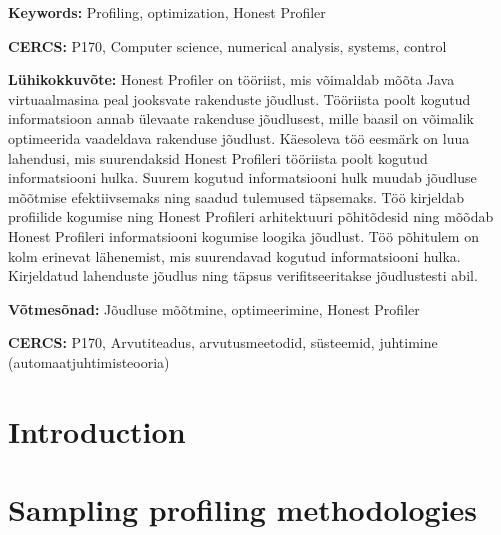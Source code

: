 \documentclass{style/thesis}
\begin{document}
\vspace*{3ex}
  \textbf{Keywords:} 
  Profiling, optimization, Honest Profiler
\vspace*{3ex}

\noindent\textbf{CERCS:} 
  P170, Computer science, numerical analysis, systems, control 

\vspace*{5ex}
\noindent\textbf{\large \articleNameEE}
\vspace*{0mm}

\noindent\textbf{Lühikokkuvõte:} Honest Profiler on tööriist, mis võimaldab mõõta Java virtuaalmasina peal jooksvate rakenduste jõudlust. Tööriista poolt kogutud informatsioon annab ülevaate rakenduse jõudlusest, mille baasil on võimalik optimeerida vaadeldava rakenduse jõudlust. Käesoleva töö eesmärk on luua lahendusi, mis suurendaksid Honest Profileri tööriista poolt kogutud informatsiooni hulka. Suurem kogutud informatsiooni hulk muudab jõudluse mõõtmise efektiivsemaks ning saadud tulemused täpsemaks. Töö kirjeldab profiilide kogumise ning Honest Profileri arhitektuuri põhitõdesid ning mõõdab Honest Profileri informatsiooni kogumise loogika jõudlust. Töö põhitulem on kolm erinevat lähenemist, mis suurendavad kogutud informatsiooni hulka. Kirjeldatud lahenduste jõudlus ning täpsus verifitseeritakse jõudlustesti abil.
\vspace*{3ex}

\begin{flushleft}
  \textbf{Võtmesõnad:} 
  Jõudluse mõõtmine, optimeerimine, Honest Profiler
\end{flushleft}
\vspace*{3ex}

\noindent\textbf{CERCS:} 
  P170, Arvutiteadus, arvutusmeetodid, süsteemid, juhtimine (automaatjuhtimisteooria)
\newpage

\tableofcontents

\newpage
\section{Introduction}


\pagebreak

\section{Sampling profiling methodologies}
\label{sec:profiling}

\end{document}

